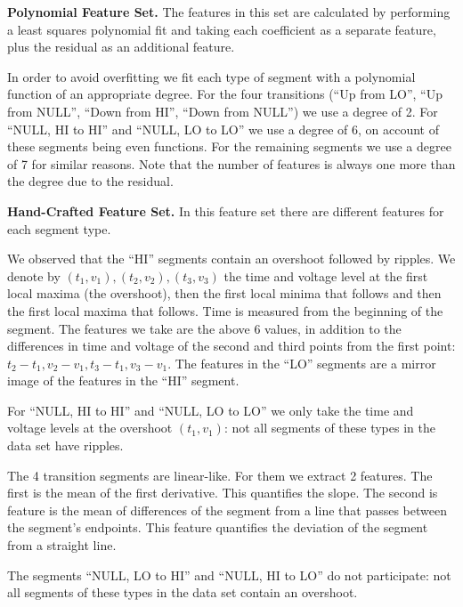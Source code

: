 \documentclass[compsoc,conference,a4paper,10pt,times]{IEEEtran}
\begin{document}
{\bf Polynomial Feature Set.}
  The features in this set are calculated by performing a least squares polynomial fit and taking each coefficient as a separate feature, plus the residual as an additional feature.
  
  In order to avoid overfitting we fit each type of segment with a polynomial function of an appropriate degree. For the four transitions (``Up from LO'', ``Up from NULL'', ``Down from HI'', ``Down from NULL'') we use a degree of 2. For ``NULL, HI to HI'' and ``NULL, LO to LO'' we use a degree of 6, on account of these segments being even functions. For the remaining segments we use a degree of 7 for similar reasons. Note that the number of features is always one more than the degree due to the residual.
  
{\bf Hand-Crafted Feature Set.}
  In this feature set there are different features for each segment type.
  
  We observed that the ``HI'' segments contain an overshoot followed by ripples. We denote by \((t_1, v_1), (t_2, v_2), (t_3, v_3)\) the time and voltage level at the first local maxima (the overshoot), then the first local minima that follows and then the first local maxima that follows. Time is measured from the beginning of the segment. The features we take are the above 6 values, in addition to the differences in time and voltage of the second and third points from the first point: \(t_2-t_1, v_2-v_1, t_3-t_1, v_3-v_1\). The features in the ``LO'' segments are a mirror image of the features in the ``HI'' segment.
  
  For ``NULL, HI to HI'' and ``NULL, LO to LO'' we only take the time and voltage levels at the overshoot \((t_1, v_1)\): not all segments of these types in the data set have ripples.
  
  The 4 transition segments are linear-like. For them we extract 2 features. The first is the mean of the first derivative. This quantifies the slope. The second is feature is the mean of differences of the segment from a line that passes between the segment's endpoints. This feature quantifies the deviation of the segment from a straight line.
  
  The segments ``NULL, LO to HI'' and ``NULL, HI to LO'' do not participate: not all segments of these types in the data set contain an overshoot.
  
\end{document}

